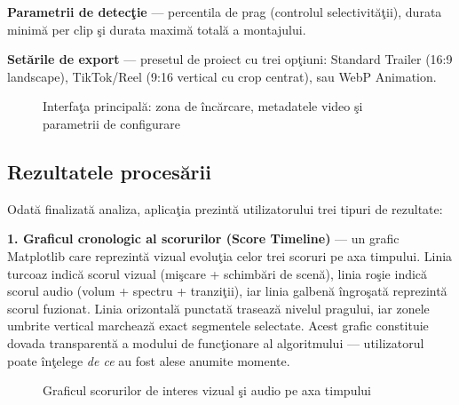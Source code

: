 \documentclass[12pt,a4paper]{article}
\begin{document}
\textbf{Parametrii de detec\c{t}ie} --- percentila de prag (controlul selectivit\u{a}\c{t}ii), durata minim\u{a}{} per clip \c{s}i durata maxim\u{a}{} total\u{a}{} a montajului.

\textbf{Set\u{a}rile de export} --- presetul de proiect cu trei op\c{t}iuni: Standard Trailer (16:9 landscape), TikTok/Reel (9:16 vertical cu crop centrat), sau WebP Animation.

\begin{figure}[H]
    \centering
    \vspace{5.5cm}
    \vspace{0.3cm}
    \caption{Interfa\c{t}a principal\u{a}: zona de \^{i}nc\u{a}rcare, metadatele video \c{s}i parametrii de configurare}
    \label{fig:ui_main}
\end{figure}

\subsection{Rezultatele proces\u{a}rii}

Odat\u{a}{} finalizat\u{a}{} analiza, aplica\c{t}ia prezint\u{a}{} utilizatorului trei tipuri de rezultate:

\textbf{1. Graficul cronologic al scorurilor (Score Timeline)} --- un grafic Matplotlib care reprezint\u{a}{} vizual evolu\c{t}ia celor trei scoruri pe axa timpului. Linia turcoaz indic\u{a}{} scorul vizual (mi\c{s}care + schimb\u{a}ri de scen\u{a}), linia ro\c{s}ie indic\u{a}{} scorul audio (volum + spectru + tranzi\c{t}ii), iar linia galben\u{a}{} \^{i}ngro\c{s}at\u{a}{} reprezint\u{a}{} scorul fuzionat. Linia orizontal\u{a}{} punctat\u{a}{} traseaz\u{a}{} nivelul pragului, iar zonele umbrite vertical marcheaz\u{a}{} exact segmentele selectate. Acest grafic constituie dovada transparent\u{a}{} a modului de func\c{t}ionare al algoritmului --- utilizatorul poate \^{i}n\c{t}elege \textit{de ce} au fost alese anumite momente.

\begin{figure}[H]
    \centering
    \vspace{5cm}
    \vspace{0.3cm}
    \caption{Graficul scorurilor de interes vizual \c{s}i audio pe axa timpului}
    \label{fig:timeline}
\end{figure}
\end{document}

